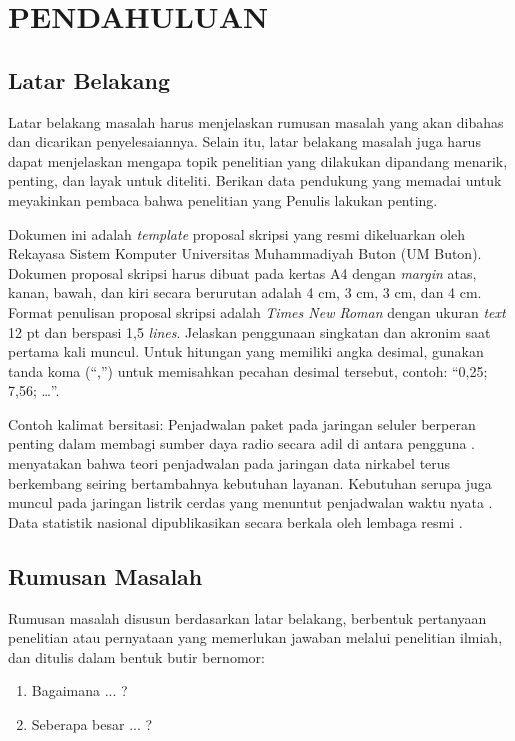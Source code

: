 \chapter{PENDAHULUAN}

\section{Latar Belakang}
Latar belakang masalah harus menjelaskan rumusan masalah yang akan dibahas dan dicarikan penyelesaiannya. Selain itu, latar belakang masalah juga harus dapat menjelaskan mengapa topik penelitian yang dilakukan dipandang menarik, penting, dan layak untuk diteliti. Berikan data pendukung yang memadai untuk meyakinkan pembaca bahwa penelitian yang Penulis lakukan penting.

Dokumen ini adalah \textit{template} proposal skripsi yang resmi dikeluarkan oleh Rekayasa Sistem Komputer Universitas Muhammadiyah Buton (UM Buton). Dokumen proposal skripsi harus dibuat pada kertas A4 dengan \textit{margin} atas, kanan, bawah, dan kiri secara berurutan adalah 4 cm, 3 cm, 3 cm, dan 4 cm. Format penulisan proposal skripsi adalah \textit{Times New Roman} dengan ukuran \textit{text} 12 pt dan berspasi 1,5 \textit{lines}. Jelaskan penggunaan singkatan dan akronim saat pertama kali muncul. Untuk hitungan yang memiliki angka desimal, gunakan tanda koma (“,”) untuk memisahkan pecahan desimal tersebut, contoh: “0,25; 7,56; …”.

Contoh kalimat bersitasi: Penjadwalan paket pada jaringan seluler berperan penting dalam membagi sumber daya radio secara adil di antara pengguna \parencite{capozzi2013}. \textcite{andrews2007} menyatakan bahwa teori penjadwalan pada jaringan data nirkabel terus berkembang seiring bertambahnya kebutuhan layanan. Kebutuhan serupa juga muncul pada jaringan listrik cerdas yang menuntut penjadwalan waktu nyata \parencite{xu2012}. Data statistik nasional dipublikasikan secara berkala oleh lembaga resmi \parencite{bps1997}.

\section{Rumusan Masalah}
Rumusan masalah disusun berdasarkan latar belakang, berbentuk pertanyaan penelitian atau pernyataan yang memerlukan jawaban melalui penelitian ilmiah, dan ditulis dalam bentuk butir bernomor:
\begin{enumerate}
\item Bagaimana ... ?
\item Seberapa besar ... ?
\end{enumerate}

